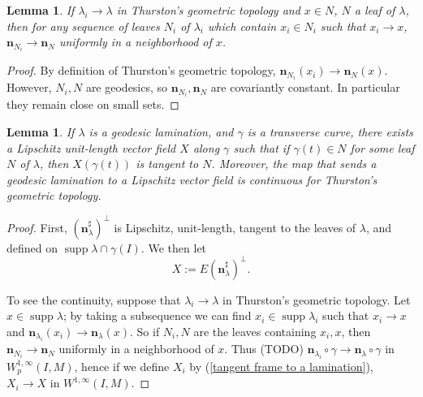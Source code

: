 \documentclass[reqno,10pt]{amsart}
\DeclareMathOperator{\supp}{supp}
\newcommand{\normal}{\mathbf n}
\newtheorem{lemma}[theorem]{Lemma}
\theoremstyle{definition}
\numberwithin{equation}{section}
\begin{document}
\begin{lemma}
If $\lambda_i \to \lambda$ in Thurston's geometric topology and $x \in N$, $N$ a leaf of $\lambda$, then for any sequence of leaves $N_i$ of $\lambda_i$ which contain $x_i \in N_i$ such that $x_i \to x$, $\normal_{N_i} \to \normal_N$ uniformly in a neighborhood of $x$.
\end{lemma}
\begin{proof}
By definition of Thurston's geometric topology, $\normal_{N_i}(x_i) \to \normal_N(x)$.
However, $N_i, N$ are geodesics, so $\normal_{N_i}, \normal_N$ are covariantly constant.
In particular they remain close on small sets.
\end{proof}

\begin{lemma}
If $\lambda$ is a geodesic lamination, and $\gamma$ is a transverse curve, there exists a Lipschitz unit-length vector field $X$ along $\gamma$ such that if $\gamma(t) \in N$ for some leaf $N$ of $\lambda$, then $X(\gamma(t))$ is tangent to $N$.
Moreover, the map that sends a geodesic lamination to a Lipschitz vector field is continuous for Thurston's geometric topology.
\end{lemma}
\begin{proof}
First, $(\normal_\lambda^\sharp)^\perp$ is Lipschitz, unit-length, tangent to the leaves of $\lambda$, and defined on $\supp \lambda \cap \gamma(I)$.
We then let
\begin{equation}\label{tangent frame to a lamination}
	X := E(\normal_\lambda^\sharp)^\perp.
\end{equation}

To see the continuity, suppose that $\lambda_i \to \lambda$ in Thurston's geometric topology.
Let $x \in \supp \lambda$; by taking a subsequence we can find $x_i \in \supp \lambda_i$ such that $x_i \to x$ and $\normal_{\lambda_i}(x_i) \to \normal_\lambda(x)$.
So if $N_i, N$ are the leaves containing $x_i, x$, then $\normal_{N_i} \to \normal_N$ uniformly in a neighborhood of $x$.
Thus (TODO) $\normal_{\lambda_i} \circ \gamma \to \normal_\lambda \circ \gamma$ in $W^{1, \infty}_p(I, M)$, hence if we define $X_i$ by (\ref{tangent frame to a lamination}), $X_i \to X$ in $W^{1, \infty}(I, M)$.
\end{proof}
\end{document}

